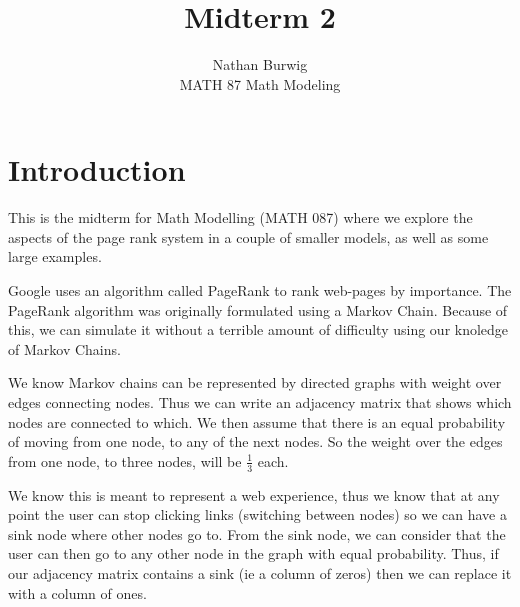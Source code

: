 \documentclass[11pt]{article}
\begin{document}
    \author{Nathan Burwig \\ MATH 87 Math Modeling} 
    \title{Midterm 2}
    \maketitle

    \section{Introduction}
    This is the midterm for Math Modelling (MATH 087) where we explore the
    aspects of the page rank system in a couple of smaller models, as well as
    some large examples.

    Google uses an algorithm called PageRank to rank web-pages by importance.
    The PageRank algorithm was originally formulated using a Markov Chain.
    Because of this, we can simulate it without a terrible amount of difficulty
    using our knoledge of Markov Chains.

    We know Markov chains can be represented by directed graphs with weight
    over edges connecting nodes. Thus we can write an adjacency matrix that
    shows which nodes are connected to which. We then assume that there is an
    equal probability of moving from one node, to any of the next nodes. So the
    weight over the edges from one node, to three nodes, will be $\frac{1}{3} $
    each.

    We know this is meant to represent a web experience, thus we know that at
    any point the user can stop clicking links (switching between nodes) so we
    can have a sink node where other nodes go to. From the sink node, we can
    consider that the user can then go to any other node in the graph with
    equal probability. Thus, if our adjacency matrix contains a sink (ie a
    column of zeros) then we can replace it with a column of ones.
    
\end{document}
